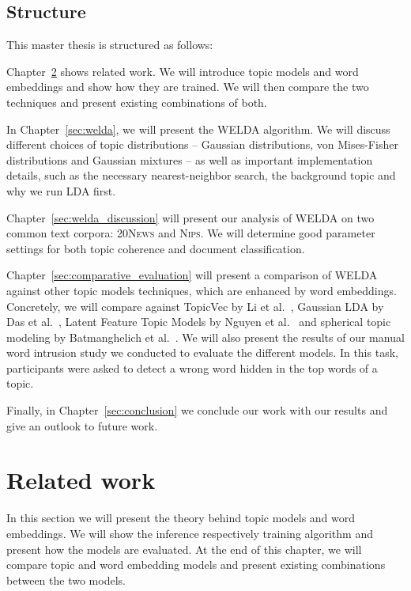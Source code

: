 \documentclass[
        a4paper,
        titlepage,
        twoside,
        parskip,
        numbers=noenddot
        ]{scrbook}
\theoremstyle{break}
\begin{document}
\section{Structure}
This master thesis is structured as follows:

\noindent Chapter~\ref{sec:related_work} shows related work.
We will introduce topic models and word embeddings and show how they are trained.
We will then compare the two techniques and present existing combinations of both.

\noindent In Chapter~\ref{sec:welda}, we will present the WELDA algorithm.
We will discuss different choices of topic distributions -- Gaussian distributions, von Mises-Fisher distributions and Gaussian mixtures -- as well as important implementation details, such as the necessary nearest-neighbor search, the background topic and why we run LDA first.

\noindent Chapter~\ref{sec:welda_discussion} will present our analysis of WELDA on two common text corpora: \textsc{20News} and \textsc{Nips}.
We will determine good parameter settings for both topic coherence and document classification.

\noindent Chapter~\ref{sec:comparative_evaluation} will present a comparison of WELDA against other topic models techniques, which are enhanced by word embeddings.
Concretely, we will compare against TopicVec by Li et al.~\cite{Li2016}, Gaussian LDA by Das et al.~\cite{Das2015}, Latent Feature Topic Models by Nguyen et al.~\cite{Nguyen2015} and spherical topic modeling by Batmanghelich et al.~\cite{Batmanghelich2016}.
We will also present the results of our manual word intrusion study we conducted to evaluate the different models.
In this task, participants were asked to detect a wrong word hidden in the top words of a topic.

\noindent Finally, in Chapter~\ref{sec:conclusion} we conclude our work with our results and give an outlook to future work.

\chapter{Related work}
\label{sec:related_work}
In this section we will present the theory behind topic models and word embeddings.
We will show the inference respectively training algorithm and present how the models are evaluated.
At the end of this chapter, we will compare topic and word embedding models and present existing combinations between the two models.
\end{document}

